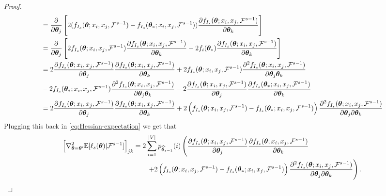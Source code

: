 \begin{proof}
\begin{align*}
    &= \frac{\partial }{\partial \bm{\theta}_j}\left[2(f_{I_s}(\bm{\theta} ; x_i, x_j, \mathcal{F}^{s-1}) - f_{I_s}(\bm{\theta}_*; x_i, x_j, \mathcal{F}^{s-1})) \frac{\partial f_{I_s}(\bm{\theta} ; x_i, x_j, \mathcal{F}^{s-1})}{\partial \bm{\theta}_k}\right]\\
    &= \frac{\partial }{\partial \bm{\theta}_j}\left[ 2f_{I_s}(\bm{\theta} ; x_i, x_j, \mathcal{F}^{s-1})\dfrac{\partial f_{I_s}(\bm{\theta} ; x_i, x_j, \mathcal{F}^{s-1})}{\partial \bm{\theta}_k} - 2f_i(\bm{\theta}_*)\dfrac{\partial f_{I_s}(\bm{\theta} ; x_i, x_j, \mathcal{F}^{s-1})}{\partial \bm{\theta}_k}\right]\\
    &= 2 \dfrac{\partial f_{I_s}(\bm{\theta} ; x_i, x_j, \mathcal{F}^{s-1})}{\partial \bm{\theta}_j}\dfrac{\partial f_{I_s}(\bm{\theta} ; x_i, x_j, \mathcal{F}^{s-1})}{\partial \bm{\theta}_k} + 2 f_{I_s}(\bm{\theta} ; x_i, x_j, \mathcal{F}^{s-1})\dfrac{\partial^2 f_{I_s}(\bm{\theta} ; x_i, x_j, \mathcal{F}^{s-1})}{\partial \bm{\theta}_j\bm{\theta}_k} \\
    &- 2 f_{I_s}(\bm{\theta}_*; x_i, x_j, \mathcal{F}^{s-1})\dfrac{\partial^2 f_{I_s}(\bm{\theta} ; x_i, x_j, \mathcal{F}^{s-1})}{\partial \bm{\theta}_j\bm{\theta}_k} - 2 \dfrac{\partial f_{I_s}(\bm{\theta} ; x_i, x_j, \mathcal{F}^{s-1})}{\partial \bm{\theta}_j}\dfrac{\partial f_{I_s}(\bm{\theta}_*; x_i, x_j, \mathcal{F}^{s-1})}{\partial \bm{\theta}_k}\\
    &= 2 \dfrac{\partial f_{I_s}(\bm{\theta} ; x_i, x_j, \mathcal{F}^{s-1})}{\partial \bm{\theta}_j}\dfrac{\partial f_{I_s}(\bm{\theta} ; x_i, x_j, \mathcal{F}^{s-1})}{\partial \bm{\theta}_k} + 2\left(f_{I_s}(\bm{\theta} ; x_i, x_j, \mathcal{F}^{s-1}) - f_{I_s}(\bm{\theta}_*; x_i, x_j, \mathcal{F}^{s-1})\right)\dfrac{\partial^2 f_{I_s}(\bm{\theta} ; x_i, x_j, \mathcal{F}^{s-1})}{\partial \bm{\theta}_j\partial\bm{\theta}_k}
\end{align*}
Plugging this back in \cref{eq:Hessian-expectation} we get that
\begin{align*}
    \left[\nabla^2_{\bm{\theta} = \bm{\theta}^{\prime}}  \mathbb{E}[\ell_{s}(\bm{\theta})|\mathcal{F}^{s-1}]\right]_{jk} &= 2\sum_{i=1}^{|V|} p_{{\widehat{\bm{\theta}}}_{s-1}}(i)\left( \dfrac{\partial f_{I_s}(\bm{\theta} ; x_i, x_j, \mathcal{F}^{s-1})}{\partial \bm{\theta}_j}\dfrac{\partial f_{I_s}(\bm{\theta} ; x_i, x_j, \mathcal{F}^{s-1})}{\partial \bm{\theta}_k}\right. \\
    &\qquad \left.+ 2\left(f_{I_s}(\bm{\theta} ; x_i, x_j, \mathcal{F}^{s-1}) - f_{I_s}(\bm{\theta}_*; x_i, x_j, \mathcal{F}^{s-1})\right)\dfrac{\partial^2 f_{I_s}(\bm{\theta} ; x_i, x_j, \mathcal{F}^{s-1})}{\partial \bm{\theta}_j\partial\bm{\theta}_k}\right).
\end{align*}
\end{proof}



